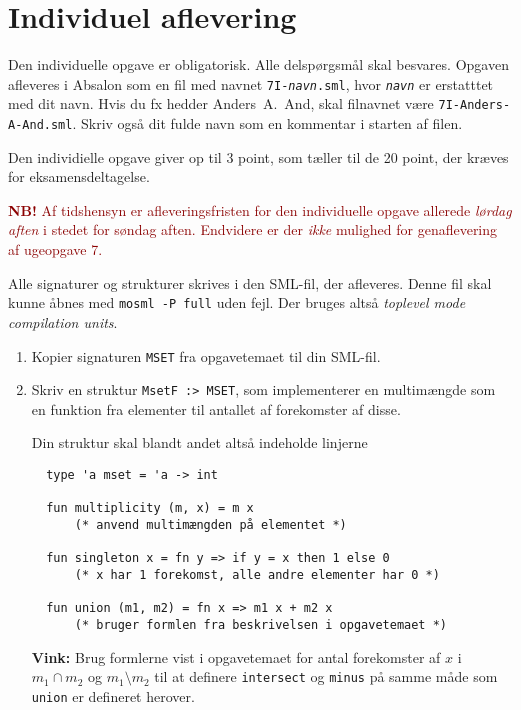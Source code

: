 \documentclass[a4paper,12pt]{article}
\begin{document}
\newpage
\section{Individuel aflevering}
\label{sec:indiv-aflev}
Den individuelle opgave er obligatorisk.  Alle delspørgsmål skal
besvares.  Opgaven afleveres i Absalon som en fil med navnet
\texttt{7I-\textit{navn}.sml}, hvor \texttt{\textit{navn}} er
erstatttet med dit navn. Hvis du fx hedder Anders~A.~And, skal
filnavnet være \texttt{7I-Anders-A-And.sml}. Skriv også dit fulde navn
som en kommentar i starten af filen.

Den individielle opgave giver op til 3 point, som tæller til de 20
point, der kræves for eksamensdeltagelse.

\textcolor{darkred}{\textbf{NB!} Af tidshensyn er afleveringsfristen
  for den individuelle opgave allerede \emph{lørdag aften} i stedet
  for søndag aften.  Endvidere er der \emph{ikke} mulighed for
  genaflevering af ugeopgave 7.}

\vspace{1ex}

Alle signaturer og strukturer skrives i den SML-fil, der afleveres.
Denne fil skal kunne åbnes med \texttt{mosml -P full} uden fejl.  Der
bruges altså \emph{toplevel mode compilation units}.

\begin{enumerate}[{7I}1]

\item Kopier signaturen \texttt{MSET} fra opgavetemaet til din SML-fil.

\item Skriv en struktur \texttt{MsetF :> MSET}, som implementerer en
  multimængde som en funktion fra elementer til antallet af
  forekomster af disse.

  Din struktur skal blandt andet altså indeholde linjerne

\begin{Verbatim}
  type 'a mset = 'a -> int

  fun multiplicity (m, x) = m x
      (* anvend multimængden på elementet *)

  fun singleton x = fn y => if y = x then 1 else 0
      (* x har 1 forekomst, alle andre elementer har 0 *)

  fun union (m1, m2) = fn x => m1 x + m2 x
      (* bruger formlen fra beskrivelsen i opgavetemaet *)
\end{Verbatim}

\textbf{Vink:} Brug formlerne vist i opgavetemaet for antal
forekomster af $x$ i $m_1 \cap m_2$ og $m_1 \setminus m_2$ til at
definere \texttt{intersect} og \texttt{minus} på samme måde som
\texttt{union} er defineret herover.

\end{enumerate}
\end{document}
